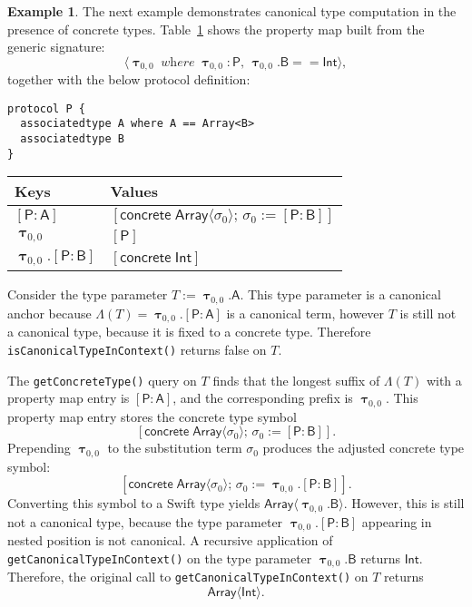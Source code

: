 \documentclass[a4paper,headsepline,bibliography=totoc,toc=flat,fleqn,twoside=semi]{scrbook}
\theoremstyle{definition}
\theoremstyle{definition}
\newtheorem{example}{Example}[chapter]
\theoremstyle{definition}
\newcommand{\namesym}[1]{\mathsf{#1}}
\newcommand{\proto}[1]{\bm{\mathsf{#1}}}
\newcommand{\protosym}[1]{[\proto{#1}]}
\newcommand{\gensig}[2]{\langle #1\;\textit{where}\;#2\rangle}
\newcommand{\genericsym}[2]{\bm{\uptau}_{#1,#2}}
\newcommand{\assocsym}[2]{[\proto{#1}\colon\namesym{#2}]}
\newcommand{\concretesym}[1]{[\mathsf{concrete}\;#1]}
\begin{document}
\begin{example} \label{concretecanonicalpropertymapex}
The next example demonstrates canonical type computation in the presence of concrete types. Table~\ref{concretecanonicalpropertymap} shows the property map built from the generic signature:
\[\gensig{\genericsym{0}{0}}{\genericsym{0}{0}\colon\proto{P},\,\genericsym{0}{0}.\namesym{B}==\namesym{Int}},\]
together with the below protocol definition:
\begin{Verbatim}
protocol P {
  associatedtype A where A == Array<B>
  associatedtype B
}
\end{Verbatim}
\begin{table}\label{concretecanonicalpropertymap}
\begin{center}
\begin{tabular}{|l|l|}
\hline
Keys&Values\\
\hline
\hline
$\assocsym{P}{A}$&$\concretesym{\namesym{Array}\langle\sigma_0\rangle;\,\sigma_0:=\assocsym{P}{B}}$\\
$\genericsym{0}{0}$&$\protosym{P}$\\
$\genericsym{0}{0}.\assocsym{P}{B}$&$\concretesym{\namesym{Int}}$\\
\hline
\end{tabular}
\end{center}
\end{table}

Consider the type parameter $T:=\genericsym{0}{0}.\namesym{A}$. This type parameter is a canonical anchor because $\Lambda(T)=\genericsym{0}{0}.\assocsym{P}{A}$ is a canonical term, however $T$ is still not a canonical type, because it is fixed to a concrete type. Therefore \texttt{isCanonicalTypeInContext()} returns false on $T$.

The \texttt{getConcreteType()} query on $T$ finds that the longest suffix of $\Lambda(T)$ with a property map entry is $\assocsym{P}{A}$, and the corresponding prefix is $\genericsym{0}{0}$. This property map entry stores the concrete type symbol
\[\concretesym{\namesym{Array}\langle\sigma_0\rangle;\,\sigma_0:=\assocsym{P}{B}}.\]
Prepending $\genericsym{0}{0}$ to the substitution term $\sigma_0$ produces the adjusted concrete type symbol:
\[\concretesym{\namesym{Array}\langle\sigma_0\rangle;\,\sigma_0:=\genericsym{0}{0}.\assocsym{P}{B}}.\]
Converting this symbol to a Swift type yields $\namesym{Array}\langle\genericsym{0}{0}.\namesym{B}\rangle$. However, this is still not a canonical type, because the type parameter $\genericsym{0}{0}.\assocsym{P}{B}$ appearing in nested position is not canonical. A recursive application of \texttt{getCanonicalTypeInContext()} on the type parameter $\genericsym{0}{0}.\namesym{B}$ returns $\namesym{Int}$. Therefore, the original call to \texttt{getCanonicalTypeInContext()} on $T$ returns
\[\namesym{Array}\langle\namesym{Int}\rangle.\]
\end{example}

\fi

\begingroup
\raggedright


\endgroup

\printindex
\end{document}
